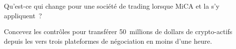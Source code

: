 \begin{interviewq}\label{iq:m3:the-crypto-trading-business:5}
Qu'est-ce qui change pour une société de trading lorsque MiCA et la  s'y appliquent~?
\end{interviewq}

\begin{interviewq}\label{iq:m3:the-crypto-trading-business:6}
Concevez les contrôles pour transférer 50~millions de dollars de crypto-actifs depuis les  vers trois plateformes de négociation en moins d'une heure.
\end{interviewq}
